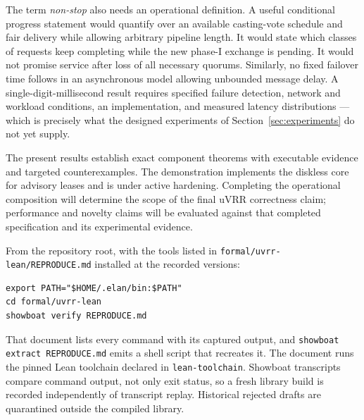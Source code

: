 \documentclass[10pt,journal,letterpaper]{IEEEtran}
\newcommand{\code}[1]{\texttt{\small #1}}
\begin{document}
The term \emph{non-stop} also needs an operational definition. A useful
conditional progress statement would quantify over an available casting-vote
schedule and fair delivery while allowing arbitrary pipeline length. It would
state which classes of requests keep completing while the new phase-I
exchange is pending. It would not promise service after loss of all necessary
quorums. Similarly, no fixed failover time follows in an asynchronous model
allowing unbounded message delay. A single-digit-millisecond result requires
specified failure detection, network and workload conditions, an implementation,
and measured latency distributions --- which is precisely what the designed
experiments of Section~\ref{sec:experiments} do not yet supply.

The present results establish exact component theorems with executable
evidence and targeted counterexamples. The demonstration implements the
diskless core for advisory leases and is under active hardening. Completing
the operational composition will determine the scope of the final uVRR
correctness claim; performance and novelty claims will be evaluated against
that completed specification and its experimental evidence.

From the repository root, with the tools listed in
\code{formal/uvrr-lean/REPRODUCE.md} installed at the recorded versions:
\begin{verbatim}
export PATH="$HOME/.elan/bin:$PATH"
cd formal/uvrr-lean
showboat verify REPRODUCE.md
\end{verbatim}
That document lists every command with its captured output, and
\code{showboat extract REPRODUCE.md} emits a shell script that recreates it.
The document runs the pinned Lean toolchain declared in
\code{lean-toolchain}. Showboat transcripts compare command output, not only
exit status, so a fresh library build is recorded independently of transcript
replay. Historical rejected drafts are quarantined outside the compiled
library.
\end{document}

